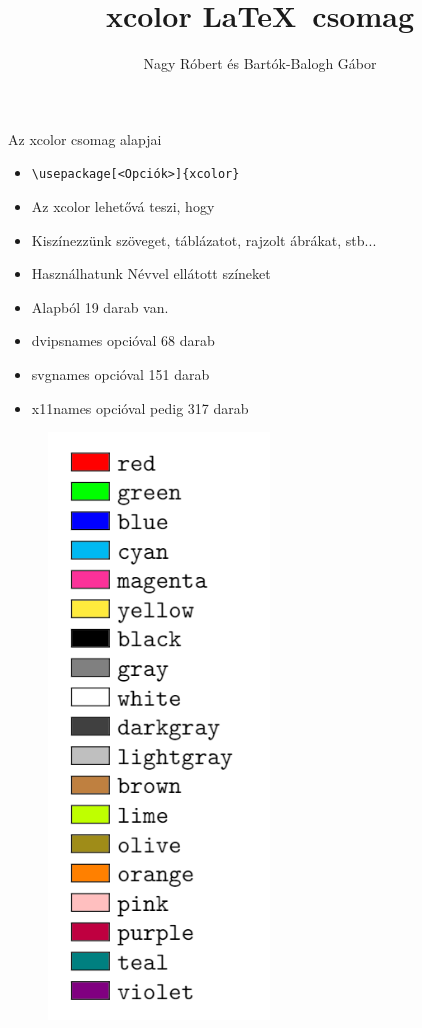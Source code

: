 \documentclass[aspectratio=1610]{beamer}
\title{\textbf{xcolor} \LaTeX\ csomag}
\author{Nagy Róbert és Bartók-Balogh Gábor}
\institute{Miskolci Egyetem}
\begin{document}
    \frame[plain]{\maketitle}
    
    \begin{frame}[fragile]{Az xcolor csomag alapjai}
        \begin{minipage}{0.6\textwidth}
            \begin{itemize}
                \item {}\verb!\usepackage[<Opciók>]{xcolor}!
                \item {}Az xcolor lehetővá teszi, hogy
                \item {}Kiszínezzünk szöveget, táblázatot, rajzolt ábrákat, stb... 
                \item {}Használhatunk Névvel ellátott színeket
                \item {}Alapból 19 darab van.
                \item {}dvipsnames opcióval 68 darab
                \item {}svgnames opcióval 151 darab 
                \item {}x11names opcióval pedig 317 darab
            \end{itemize}
        \end{minipage} \hfill
        \begin{minipage}{0.35\textwidth}    
            \begin{figure}
                \includegraphics[scale=0.4]{img/szinek.png}

\end{figure}
\end{minipage}
\end{frame}
\end{document}
